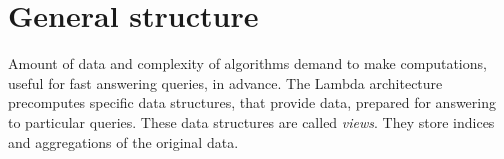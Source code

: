 \section{General structure}





Amount of data and complexity of algorithms demand to make computations, useful for fast answering queries, in advance.
The Lambda architecture precomputes specific data structures, that provide data, prepared for answering to particular queries.
These data structures are called \textit{views}.
They store indices and aggregations of the original data.

